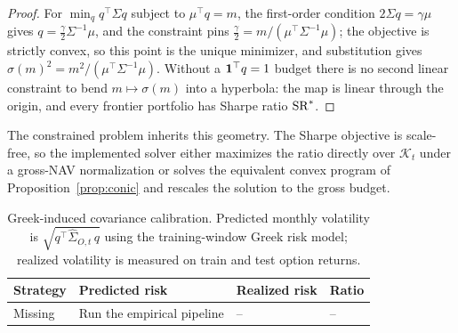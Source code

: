 \begin{proof}
For \(\min_q q^\top\Sigma q\) subject to \(\mu^\top q=m\), the first-order condition
\(2\Sigma q=\gamma\mu\) gives \(q=\tfrac{\gamma}{2}\Sigma^{-1}\mu\), and the constraint
pins \(\tfrac{\gamma}{2}=m/(\mu^\top\Sigma^{-1}\mu)\); the objective is strictly convex, so
this point is the unique minimizer, and substitution gives
\(\sigma(m)^2=m^2/(\mu^\top\Sigma^{-1}\mu)\). Without a \(\mathbf{1}^\top q=1\) budget there is no
second linear constraint to bend \(m\mapsto\sigma(m)\) into a hyperbola: the map is linear
through the origin, and every frontier portfolio has Sharpe ratio \(\operatorname{SR}^{\ast}\).
\end{proof}

The constrained problem inherits this geometry. The Sharpe objective is scale-free, so the
implemented solver either maximizes the ratio directly over \(\mathcal K_t\) under a
gross-NAV normalization or solves the equivalent convex program of
Proposition~\ref{prop:conic} and rescales the solution to the gross budget.

\begin{table}[H]
\centering
\scriptsize
{}
  {\resizebox{0.94\textwidth}{!}{}}
  {\begin{tabular}{llll}\toprule Strategy & Predicted risk & Realized risk & Ratio \\\midrule
  Missing & Run the empirical pipeline & -- & -- \\\bottomrule\end{tabular}}
\caption{Greek-induced covariance calibration. Predicted monthly volatility is
\(\sqrt{q^\top\widehat\Sigma_{O,t}\,q}\) using the training-window Greek risk model;
realized volatility is measured on train and test option returns.}
\label{tab:risk_calibration}
\end{table}

